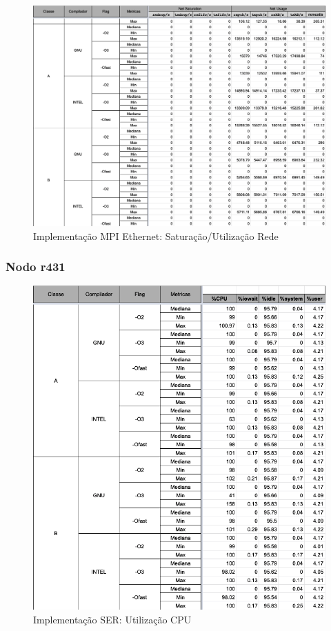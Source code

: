 \documentclass{article}
\begin{document}
\begin{appendices}
\begin{figure}[H]
    \centering
    \includegraphics[width=12cm]{Pictures/LUMZ_r641_MPIE_NET.png}
    \caption{Implementação MPI Ethernet: Saturação/Utilização Rede}
    \label{figure:LUMZ_r641_MPIE_NET}
\end{figure}

\subsubsection{Nodo r431}

\begin{figure}[H]
    \centering
    \includegraphics[width=12cm]{Pictures/LUMZ_r431_SER_CPU.png}
    \caption{Implementação SER: Utilização CPU}
    \label{figure:LUMZ_r431_SER_CPU}
\end{figure}


\end{appendices}
\end{document}
